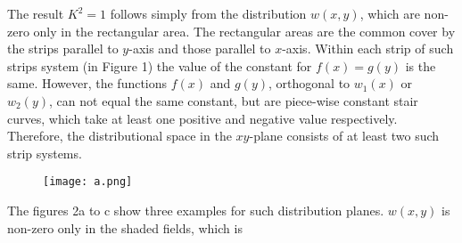 \documentclass{article}
\begin{document}
The result $K^2=1$ follows simply from the distribution
$w(x,y)$, which are non-zero only in the rectangular
area. The rectangular areas are the common cover
by the strips parallel to
$y$-axis and those parallel to $x$-axis.
Within each strip of such strips system (in Figure 1)
the value of the constant for $f(x) = g(y)$ is the same.
However, the functions $f(x)$ and $g(y)$, orthogonal to
$w_1(x)$ or $w_2(y)$, can not equal
the same constant, but are piece-wise constant stair curves,
which take at least one positive and negative value respectively. Therefore, the distributional space in
the $xy$-plane consists of at least two such strip systems.
\begin{figure}[!ht]
    \centering
    \texttt{[image: a.png]}
\end{figure}
The figures 2a to c show three examples for such distribution
planes. $w(x,y)$ is non-zero only in the shaded fields,
which is 
\end{document}
